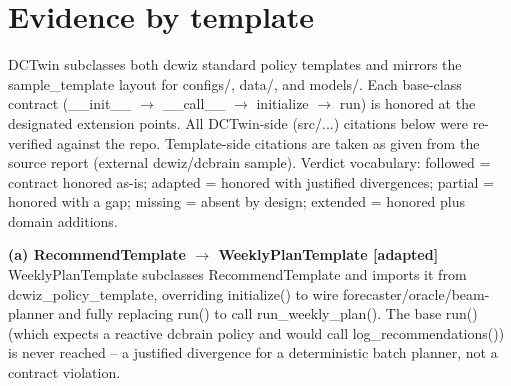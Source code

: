\documentclass[10pt]{article}
\begin{document}
\section*{Evidence by template}
DCTwin subclasses both dcwiz standard policy templates and mirrors the sample\_\allowbreak{}template layout for configs/\allowbreak{}, data/\allowbreak{}, and models/\allowbreak{}. Each base-class contract (\_\allowbreak{}\_\allowbreak{}init\_\allowbreak{}\_\allowbreak{} $\rightarrow$ \_\allowbreak{}\_\allowbreak{}call\_\allowbreak{}\_\allowbreak{} $\rightarrow$ initialize $\rightarrow$ run) is honored at the designated extension points. All DCTwin-side (src/\allowbreak{}...) citations below were re-verified against the repo. Template-side citations are taken as given from the source report (external dcwiz/\allowbreak{}dcbrain sample). Verdict vocabulary: followed = contract honored as-is; adapted = honored with justified divergences; partial = honored with a gap; missing = absent by design; extended = honored plus domain additions.

\smallskip\noindent\textbf{(a) RecommendTemplate $\rightarrow$ WeeklyPlanTemplate [adapted]}\\[1pt]
WeeklyPlanTemplate subclasses RecommendTemplate and imports it from dcwiz\_\allowbreak{}policy\_\allowbreak{}template, overriding initialize() to wire forecaster/\allowbreak{}oracle/\allowbreak{}beam-planner and fully replacing run() to call run\_\allowbreak{}weekly\_\allowbreak{}plan(). The base run() (which expects a reactive dcbrain policy and would call log\_\allowbreak{}recommendations()) is never reached -- a justified divergence for a deterministic batch planner, not a contract violation.
\end{document}
